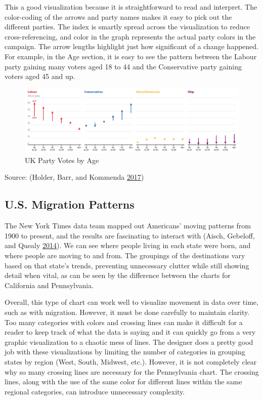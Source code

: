 \documentclass[]{book}
\begin{document}
This a good visualization because it is straightforward to read and interpret. The color-coding of the arrows and party names makes it easy to pick out the different parties. The index is smartly spread across the visualization to reduce cross-referencing, and color in the graph represents the actual party colors in the campaign. The arrow lengths highlight just how significant of a change happened. For example, in the Age section, it is easy to see the pattern between the Labour party gaining many voters aged 18 to 44 and the Conservative party gaining voters aged 45 and up.

\begin{figure}
\centering
\includegraphics{images/Party_Votes_by_Age.png}
\caption{UK Party Votes by Age}
\end{figure}

Source: (Holder, Barr, and Kommenda \protect\hyperlink{ref-UKvotes2017}{2017})

\hypertarget{u.s.-migration-patterns}{%
\subsection{U.S. Migration Patterns}\label{u.s.-migration-patterns}}

The New York Times data team mapped out Americans' moving patterns from 1900 to present, and the results are fascinating to interact with (Aisch, Gebeloff, and Quealy \protect\hyperlink{ref-migration}{2014}). We can see where people living in each state were born, and where people are moving to and from. The groupings of the destinations vary based on that state's trends, preventing unnecessary clutter while still showing detail when vital, as can be seen by the difference between the charts for California and Pennsylvania.

Overall, this type of chart can work well to visualize movement in data over time, such as with migration. However, it must be done carefully to maintain clarity. Too many categories with colors and crossing lines can make it difficult for a reader to keep track of what the data is saying and it can quickly go from a very graphic visualization to a chaotic mess of lines. The designer does a pretty good job with these visualizations by limiting the number of categories in grouping states by region (West, South, Midwest, etc.). However, it is not completely clear why so many crossing lines are necessary for the Pennsylvania chart. The crossing lines, along with the use of the same color for different lines within the same regional categories, can introduce unnecessary complexity.
\end{document}

